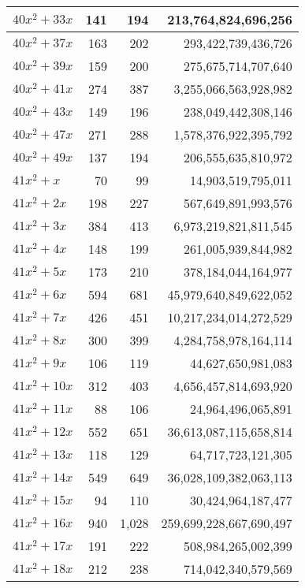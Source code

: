 \documentclass[a4paper]{amsproc}
\theoremstyle{plain}
\begin{document}
\begin{longtable}{ | l | r | r | r | }
$40x^2 + 33x$ & 141 & 194 & 213{,}764{,}824{,}696{,}256 \\ \hline
$40x^2 + 37x$ & 163 & 202 & 293{,}422{,}739{,}436{,}726 \\ \hline
$40x^2 + 39x$ & 159 & 200 & 275{,}675{,}714{,}707{,}640 \\ \hline
$40x^2 + 41x$ & 274 & 387 & 3{,}255{,}066{,}563{,}928{,}982 \\ \hline
$40x^2 + 43x$ & 149 & 196 & 238{,}049{,}442{,}308{,}146 \\ \hline
$40x^2 + 47x$ & 271 & 288 & 1{,}578{,}376{,}922{,}395{,}792 \\ \hline
$40x^2 + 49x$ & 137 & 194 & 206{,}555{,}635{,}810{,}972 \\ \hline
$41x^2 + x$ & 70 & 99 & 14{,}903{,}519{,}795{,}011 \\ \hline
$41x^2 + 2x$ & 198 & 227 & 567{,}649{,}891{,}993{,}576 \\ \hline
$41x^2 + 3x$ & 384 & 413 & 6{,}973{,}219{,}821{,}811{,}545 \\ \hline
$41x^2 + 4x$ & 148 & 199 & 261{,}005{,}939{,}844{,}982 \\ \hline
$41x^2 + 5x$ & 173 & 210 & 378{,}184{,}044{,}164{,}977 \\ \hline
$41x^2 + 6x$ & 594 & 681 & 45{,}979{,}640{,}849{,}622{,}052 \\ \hline
$41x^2 + 7x$ & 426 & 451 & 10{,}217{,}234{,}014{,}272{,}529 \\ \hline
$41x^2 + 8x$ & 300 & 399 & 4{,}284{,}758{,}978{,}164{,}114 \\ \hline
$41x^2 + 9x$ & 106 & 119 & 44{,}627{,}650{,}981{,}083 \\ \hline
$41x^2 + 10x$ & 312 & 403 & 4{,}656{,}457{,}814{,}693{,}920 \\ \hline
$41x^2 + 11x$ & 88 & 106 & 24{,}964{,}496{,}065{,}891 \\ \hline
$41x^2 + 12x$ & 552 & 651 & 36{,}613{,}087{,}115{,}658{,}814 \\ \hline
$41x^2 + 13x$ & 118 & 129 & 64{,}717{,}723{,}121{,}305 \\ \hline
$41x^2 + 14x$ & 549 & 649 & 36{,}028{,}109{,}382{,}063{,}113 \\ \hline
$41x^2 + 15x$ & 94 & 110 & 30{,}424{,}964{,}187{,}477 \\ \hline
$41x^2 + 16x$ & 940 & 1{,}028 & 259{,}699{,}228{,}667{,}690{,}497 \\ \hline
$41x^2 + 17x$ & 191 & 222 & 508{,}984{,}265{,}002{,}399 \\ \hline
$41x^2 + 18x$ & 212 & 238 & 714{,}042{,}340{,}579{,}569 \\ \hline

\end{longtable}
\end{document}
